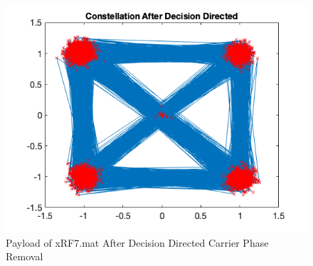 \begin{figure}[h!]
    \centering
    \includegraphics[scale=0.4]{figures/payload_xrf7_after_dd.png}
    \caption{Payload of xRF7.mat After Decision Directed Carrier Phase Removal}
    \label{fig:after-dd}
\end{figure}


